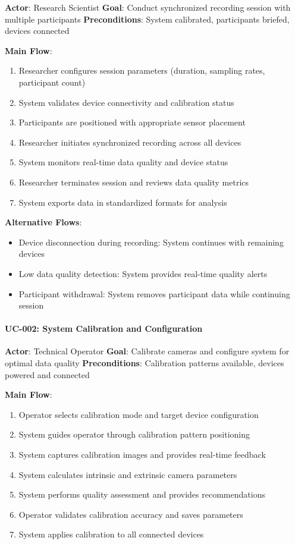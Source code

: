 \documentclass[12pt,a4paper]{report}
\begin{document}
\textbf{Actor}: Research Scientist  
\textbf{Goal}: Conduct synchronized recording session with multiple participants  
\textbf{Preconditions}: System calibrated, participants briefed, devices connected

\textbf{Main Flow}:

\begin{enumerate}
\item Researcher configures session parameters (duration, sampling rates, participant count)
\item System validates device connectivity and calibration status
\item Participants are positioned with appropriate sensor placement
\item Researcher initiates synchronized recording across all devices
\item System monitors real-time data quality and device status
\item Researcher terminates session and reviews data quality metrics
\item System exports data in standardized formats for analysis

\end{enumerate}
\textbf{Alternative Flows}:

\begin{itemize}
\item Device disconnection during recording: System continues with remaining devices
\item Low data quality detection: System provides real-time quality alerts
\item Participant withdrawal: System removes participant data while continuing session

\end{itemize}
\paragraph{UC-002: System Calibration and Configuration}

\textbf{Actor}: Technical Operator  
\textbf{Goal}: Calibrate cameras and configure system for optimal data quality  
\textbf{Preconditions}: Calibration patterns available, devices powered and connected

\textbf{Main Flow}:

\begin{enumerate}
\item Operator selects calibration mode and target device configuration
\item System guides operator through calibration pattern positioning
\item System captures calibration images and provides real-time feedback
\item System calculates intrinsic and extrinsic camera parameters
\item System performs quality assessment and provides recommendations
\item Operator validates calibration accuracy and saves parameters
\item System applies calibration to all connected devices

\end{enumerate}
\end{document}
